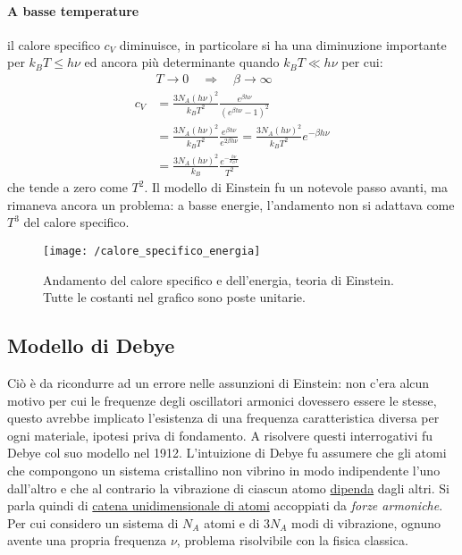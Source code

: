 \paragraph{A basse temperature} il calore specifico $c_V$ diminuisce, in particolare si ha una diminuzione importante per $k_B T\le h \nu$ ed ancora più determinante quando $k_B T \ll h \nu$ per cui:
\begin{equation}
\begin{split}
& T\to0 \quad\Rightarrow\quad \beta \to \infty \\
c_V & = \frac{3 N_A (h\nu)^2}{k_B T^2} \frac{e^{\beta h \nu}}{(e^{\beta h \nu}-1)^2} \\
& = \frac{3 N_A (h\nu)^2}{k_B T^2} \frac{e^{\beta h \nu}}{e^{2 \beta h \nu}} = \frac{3 N_A (h\nu)^2}{k_B T^2} e^{- \beta h \nu} \\
& = \frac{3 N_A (h\nu)^2}{k_B} \frac{e^{- \frac{h \nu}{k_B T}}}{T^2}
\end{split}
\end{equation}
che tende a zero come $T^2$.
Il modello di Einstein fu un notevole passo avanti, ma rimaneva ancora un problema: a basse energie, l'andamento non si adattava come $T^3$ del calore specifico.

\begin{figure}[h]
\centering
\texttt{[image: /calore\_specifico\_energia]}
\caption{Andamento del calore specifico e dell'energia, teoria di Einstein. Tutte le costanti nel grafico sono poste unitarie.}
\end{figure}


\subsection{Modello di Debye}
Ciò è da ricondurre ad un errore nelle assunzioni di Einstein: 
non c'era alcun motivo per cui le frequenze degli oscillatori armonici dovessero essere le stesse, 
questo avrebbe implicato l'esistenza di una frequenza caratteristica diversa per ogni materiale, ipotesi priva di fondamento.
A risolvere questi interrogativi fu Debye col suo modello nel 1912.
L'intuizione di Debye fu assumere che gli atomi che compongono un sistema cristallino non vibrino in modo indipendente l'uno dall'altro e che al contrario la vibrazione di ciascun atomo \underline{dipenda} dagli altri.
Si parla quindi di \underline{catena unidimensionale di atomi} accoppiati da \textit{forze armoniche}.
Per cui considero un sistema di $N_A$ atomi e di $3 N_A$ modi di vibrazione, ognuno avente una propria frequenza $\nu$, problema risolvibile con la fisica classica.

